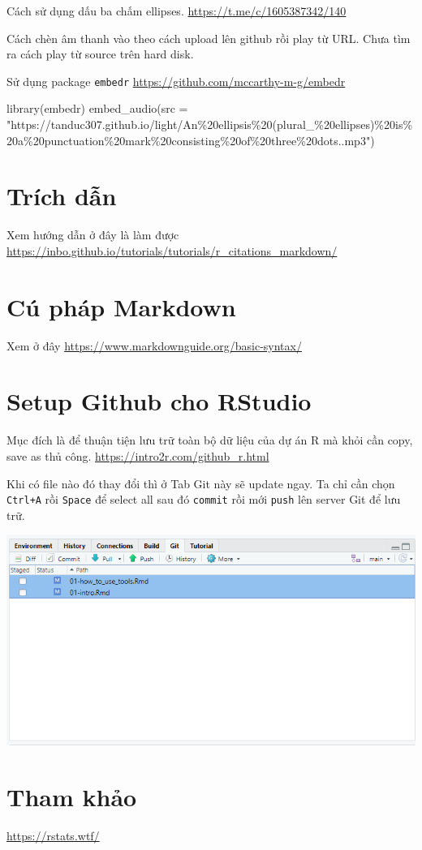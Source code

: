 \documentclass[
]{book}
\newenvironment{Shaded}{\begin{snugshade}}{\end{snugshade}}
\newcommand{\AttributeTok}[1]{\textcolor[rgb]{0.77,0.63,0.00}{#1}}
\newcommand{\FunctionTok}[1]{\textcolor[rgb]{0.00,0.00,0.00}{#1}}
\newcommand{\NormalTok}[1]{#1}
\newcommand{\StringTok}[1]{\textcolor[rgb]{0.31,0.60,0.02}{#1}}
\begin{document}
Cách sử dụng dấu ba chấm ellipses. \url{https://t.me/c/1605387342/140}

Cách chèn âm thanh vào theo cách upload lên github rồi play từ URL. Chưa tìm ra cách play từ source trên hard disk.

Sử dụng package \texttt{embedr} \url{https://github.com/mccarthy-m-g/embedr}

\begin{Shaded}
\begin{Highlighting}[]
\FunctionTok{library}\NormalTok{(embedr)}
\FunctionTok{embed\_audio}\NormalTok{(}\AttributeTok{src =} \StringTok{"https://tanduc307.github.io/light/An\%20ellipsis\%20(plural\_\%20ellipses)\%20is\%20a\%20punctuation\%20mark\%20consisting\%20of\%20three\%20dots..mp3"}\NormalTok{)}
\end{Highlighting}
\end{Shaded}

\hypertarget{truxedch-dux1eabn}{%
\section{Trích dẫn}\label{truxedch-dux1eabn}}

Xem hướng dẫn ở đây là làm được \url{https://inbo.github.io/tutorials/tutorials/r_citations_markdown/}

\hypertarget{cuxfa-phuxe1p-markdown}{%
\section{Cú pháp Markdown}\label{cuxfa-phuxe1p-markdown}}

Xem ở đây \url{https://www.markdownguide.org/basic-syntax/}

\hypertarget{setup-github-cho-rstudio}{%
\section{Setup Github cho RStudio}\label{setup-github-cho-rstudio}}

Mục đích là để thuận tiện lưu trữ toàn bộ dữ liệu của dự án R mà khỏi cần copy, save as thủ công. \url{https://intro2r.com/github_r.html}

Khi có file nào đó thay đổi thì ở Tab Git này sẽ update ngay. Ta chỉ cần chọn \texttt{Ctrl+A} rồi \texttt{Space} để select all sau đó \texttt{commit} rồi mới \texttt{push} lên server Git để lưu trữ.

\includegraphics{01-how_to_use_tools_insertimage_1.png}

\hypertarget{tham-khux1ea3o}{%
\section{Tham khảo}\label{tham-khux1ea3o}}

\url{https://rstats.wtf/}

  
\end{document}
